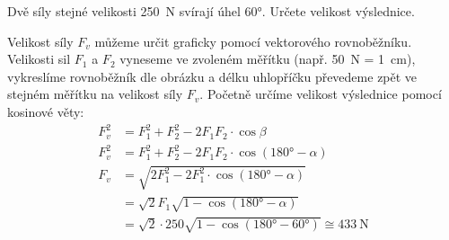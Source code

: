 \begin{mdframed}[style=mdexam]
  \begin{example}\label{fyz:fey_exam012}
    Dvě síly stejné velikosti \SI{250}{\newton} svírají úhel \ang{60}. Určete velikost výslednice.
        
    {\centering
    \captionsetup{type=figure}
    \par}
    
    Velikost síly \(F_v\) můžeme určit graficky pomocí vektorového rovnoběžníku. Velikosti sil
    \(F_1\) a \(F_2\) vyneseme ve zvoleném měřítku (např. \SI{50}{\newton} = \SI{1}{\cm}),
    vykreslíme rovnoběžník dle obrázku a délku uhlopříčku převedeme zpět ve stejném měřítku na
    velikost síly \(F_v\). Početně určíme velikost výslednice pomocí kosinové věty: 
    \begin{align*}
      F_v^2 &= F_1^2 + F_2^2 - 2F_1F_2\cdot\cos\beta               \\
      F_v^2 &= F_1^2 + F_2^2 - 2F_1F_2\cdot\cos(\ang{180}- \alpha) \\
      F_v   &= \sqrt{2F_1^2 - 2F_1^2\cdot\cos(\ang{180}- \alpha)}  \\
            &= \sqrt{2}F_1\sqrt{1-\cos(\ang{180}- \alpha)}         \\
            &= \sqrt{2}\cdot250\sqrt{1-\cos(\ang{180} - \ang{60})} 
               \cong \SI{433}{\newton}
    \end{align*}
  \end{example}
\end{mdframed}
